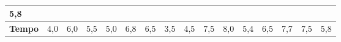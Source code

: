 \documentclass[12pt,brazil,oneside]{book}
\begin{document}
\begin{longtable}[]{@{}llllllllllllllll@{}}
\begin{minipage}[b]{0.03\columnwidth}
5,8\strut
\end{minipage}\tabularnewline
\midrule
\endfirsthead
\toprule
\begin{minipage}[b]{0.09\columnwidth}\raggedright
\textbf{Tempo}\strut
\end{minipage} & \begin{minipage}[b]{0.03\columnwidth}\raggedright
4,0\strut
\end{minipage} & \begin{minipage}[b]{0.03\columnwidth}\raggedright
6,0\strut
\end{minipage} & \begin{minipage}[b]{0.03\columnwidth}\raggedright
5,5\strut
\end{minipage} & \begin{minipage}[b]{0.03\columnwidth}\raggedright
5,0\strut
\end{minipage} & \begin{minipage}[b]{0.03\columnwidth}\raggedright
6,8\strut
\end{minipage} & \begin{minipage}[b]{0.03\columnwidth}\raggedright
6,5\strut
\end{minipage} & \begin{minipage}[b]{0.03\columnwidth}\raggedright
3,5\strut
\end{minipage} & \begin{minipage}[b]{0.03\columnwidth}\raggedright
4,5\strut
\end{minipage} & \begin{minipage}[b]{0.03\columnwidth}\raggedright
7,5\strut
\end{minipage} & \begin{minipage}[b]{0.03\columnwidth}\raggedright
8,0\strut
\end{minipage} & \begin{minipage}[b]{0.03\columnwidth}\raggedright
5,4\strut
\end{minipage} & \begin{minipage}[b]{0.03\columnwidth}\raggedright
6,5\strut
\end{minipage} & \begin{minipage}[b]{0.03\columnwidth}\raggedright
7,7\strut
\end{minipage} & \begin{minipage}[b]{0.03\columnwidth}\raggedright
7,5\strut
\end{minipage} & \begin{minipage}[b]{0.03\columnwidth}\raggedright
5,8\strut
\end{minipage}\tabularnewline

\end{longtable}
\end{document}
